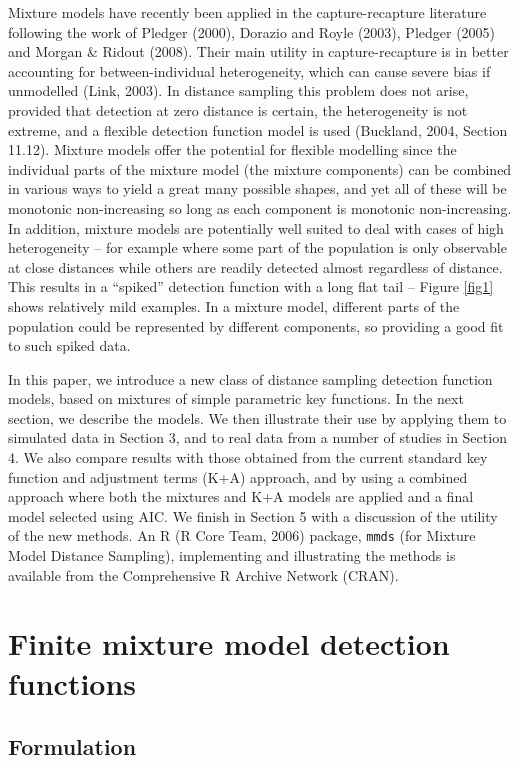 \documentclass[useAMS,referee]{biom}
\begin{document}
Mixture models have recently been applied in the capture-recapture literature following the work of Pledger (2000), Dorazio and Royle (2003), Pledger (2005) and Morgan \& Ridout (2008). Their main utility in capture-recapture is in better accounting for between-individual heterogeneity, which can cause severe bias if unmodelled (Link, 2003). In distance sampling this problem does not arise, provided that detection at zero distance is certain, the heterogeneity is not extreme, and a flexible detection function model is used (Buckland, 2004, Section 11.12).  Mixture models offer the potential for flexible modelling since the individual parts of the mixture model (the mixture components) can be combined in various ways to yield a great many possible shapes, and yet all of these will be monotonic non-increasing so long as each component is monotonic non-increasing.  In addition, mixture models are potentially well suited to deal with cases of high heterogeneity -- for example where some part of the population  is only observable at close distances while others are readily detected almost regardless of distance.  This results in a ``spiked'' detection function with a long flat tail -- Figure \ref{fig1} shows relatively mild examples.  In a mixture model, different parts of the population could be represented by different components, so providing a good fit to such spiked data. 

In this paper, we introduce a new class of distance sampling detection function models, based on mixtures of simple parametric key functions.  In the next section, we describe the models.  We then illustrate their use by applying them to simulated data in Section 3, and to real data from a number of studies in Section 4. We also compare results with those obtained from the current standard key function and adjustment terms (K+A) approach, and by using a combined approach where both the mixtures and K+A models are applied and a final model selected using AIC.  We finish in Section 5 with a discussion of the utility of the new methods.  An R (R Core Team, 2006) package, \texttt{mmds} (for Mixture Model Distance Sampling), implementing and illustrating the methods is available from the Comprehensive R Archive Network (CRAN).

\section{Finite mixture model detection functions}

\subsection{Formulation}
\label{s:detfcts}
\end{document}
